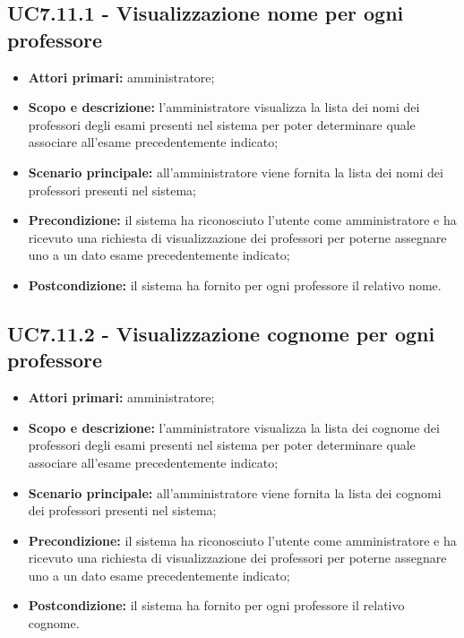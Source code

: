 \documentclass[AnalisiDeiRequisiti.tex]{subfiles}
\begin{document}
\subsection{UC7.11.1 - Visualizzazione nome per ogni professore}
\begin{itemize}
	\item \textbf{Attori primari:} amministratore;
	\item \textbf{Scopo e descrizione:} l'amministratore visualizza la lista dei nomi dei professori degli esami presenti nel sistema per poter determinare quale associare all'esame precedentemente indicato;
	\item \textbf{Scenario principale:} all'amministratore viene fornita la lista dei nomi dei professori presenti nel sistema;
	\item \textbf{Precondizione:} il sistema ha riconosciuto l'utente come amministratore e ha ricevuto una richiesta di visualizzazione dei professori per poterne assegnare uno a un dato esame precedentemente indicato; 
	\item \textbf{Postcondizione:} il sistema ha fornito per ogni professore il relativo nome.
\end{itemize}
\subsection{UC7.11.2 - Visualizzazione cognome per ogni professore}
\begin{itemize}
	\item \textbf{Attori primari:} amministratore;
	\item \textbf{Scopo e descrizione:} l'amministratore visualizza la lista dei cognome dei professori degli esami presenti nel sistema per poter determinare quale associare all'esame precedentemente indicato;
	\item \textbf{Scenario principale:} all'amministratore viene fornita la lista dei cognomi dei professori presenti nel sistema;
	\item \textbf{Precondizione:} il sistema ha riconosciuto l'utente come amministratore e ha ricevuto una richiesta di visualizzazione dei professori per poterne assegnare uno a un dato esame precedentemente indicato; 
	\item \textbf{Postcondizione:} il sistema ha fornito per ogni professore il relativo cognome.
\end{itemize}
\end{document}
